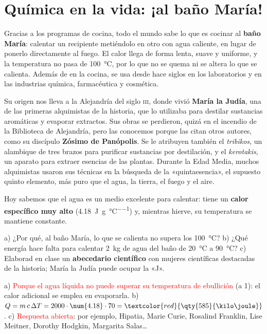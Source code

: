 \section{Química en la vida: ¡al baño María!}\label{sec:ud6-bano}

Gracias a los programas de cocina, todo el mundo sabe lo que es cocinar al \textbf{baño María}: calentar un recipiente metiéndolo
en otro con agua caliente, en lugar de ponerlo directamente al fuego. El calor llega de forma lenta, suave y uniforme, y la
temperatura no pasa de \qty{100}{\degreeCelsius}, por lo que no se quema ni se altera lo que se calienta. Además de en la cocina, se
usa desde hace siglos en los laboratorios y en las industrias química, farmacéutica y cosmética.

Su origen nos lleva a la Alejandría del siglo \textsc{iii}, donde vivió \textbf{María la Judía}, una de las primeras alquimistas de
la historia, que lo utilizaba para destilar sustancias aromáticas y evaporar extractos. Sus obras se perdieron, quizá en el
incendio de la Biblioteca de Alejandría, pero las conocemos porque las citan otros autores, como su discípulo \textbf{Zósimo de
Panópolis}. Se le atribuyen también el \textit{tribikos}, un alambique de tres brazos para purificar sustancias por destilación, y
el \textit{kerotakis}, un aparato para extraer esencias de las plantas. Durante la Edad Media, muchos alquimistas usaron sus
técnicas en la búsqueda de la «quintaesencia», el supuesto quinto elemento, más puro que el agua, la tierra, el fuego y el aire.

Hoy sabemos que el agua es un medio excelente para calentar: tiene un \textbf{calor específico muy alto}
(\qty{4.18}{\joule\per\gram\per\degreeCelsius}) y, mientras hierve, su temperatura se mantiene constante.

\begin{exercise}
    a) ¿Por qué, al baño María, lo que se calienta no supera los \qty{100}{\degreeCelsius}? b) ¿Qué energía hace falta para calentar
    \qty{2}{\kilo\gram} de agua del baño de \qty{20}{\degreeCelsius} a \qty{90}{\degreeCelsius}? c) Elaborad en clase un
    \textbf{abecedario científico} con mujeres científicas destacadas de la historia; María la Judía puede ocupar la «J».
    \begin{solu}
        a) \textcolor{red}{Porque el agua líquida no puede superar su temperatura de ebullición} (a \qty{1}{\atm}): el calor
        adicional se emplea en evaporarla. b) \(Q = m\,c\,\Delta T = 2000 \cdot \num{4.18} \cdot 70 = \textcolor{red}{\qty{585}{\kilo\joule}}\).
        c) \textcolor{red}{Respuesta abierta}: por ejemplo, Hipatia, Marie Curie, Rosalind Franklin, Lise Meitner, Dorothy Hodgkin,
        Margarita Salas…
    \end{solu}
\end{exercise}

